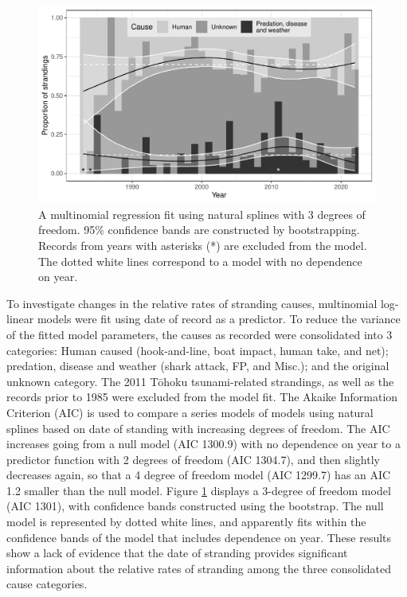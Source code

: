 \documentclass[sn-basic,NameDate]{sn-jnl}\usepackage[]{graphicx}\usepackage[]{xcolor}
\makeatletter
\def\maxwidth{ %
  \ifdim\Gin@nat@width>\linewidth
    \linewidth
  \else
    \Gin@nat@width
  \fi
}
\newenvironment{knitrout}{}{} %
\makeatother
\begin{document}
\begin{figure}[tbp]
\begin{knitrout}
\color{fgcolor}
\includegraphics[width=\maxwidth]{figure/Figure-4} 
\end{knitrout}
\caption{A multinomial regression fit using natural splines with 3 degrees of freedom. 95\% confidence bands are constructed by bootstrapping. Records from years with asterisks (*) are excluded from the model. The dotted white lines correspond to a model with no dependence on year. 
}\label{fig:model}
\end{figure}


To investigate changes in the relative rates of stranding causes, multinomial log-linear models were fit using date of record as a predictor. 
To reduce the variance of the fitted model parameters, the causes as recorded were consolidated into 3 categories: Human caused (hook-and-line, boat impact, human take, and net); predation, disease and weather (shark attack, FP, and Misc.); and the original unknown category. 
The 2011 T\={o}hoku tsunami-related strandings, as well as the records prior to 1985 were excluded from the model fit.
The Akaike Information Criterion (AIC) is used to compare a series models of models using natural splines based on date of standing with increasing degrees of freedom.
The AIC increases going from a null model (AIC 1300.9) with no dependence on year
to a predictor function with 2 degrees of freedom (AIC 1304.7), 
and then slightly decreases again, so that a 4 degree of freedom model (AIC 1299.7)
has an AIC 1.2 smaller than the null model. 
Figure \ref{fig:model} displays a 3-degree of freedom model (AIC 1301),
with confidence bands constructed using the bootstrap.
The null model is represented by dotted white lines, and apparently fits within the confidence bands of the model that includes dependence on year. 
These results show a lack of evidence that the date of stranding provides significant information about the relative rates of stranding among the three consolidated cause categories.
\end{document}
